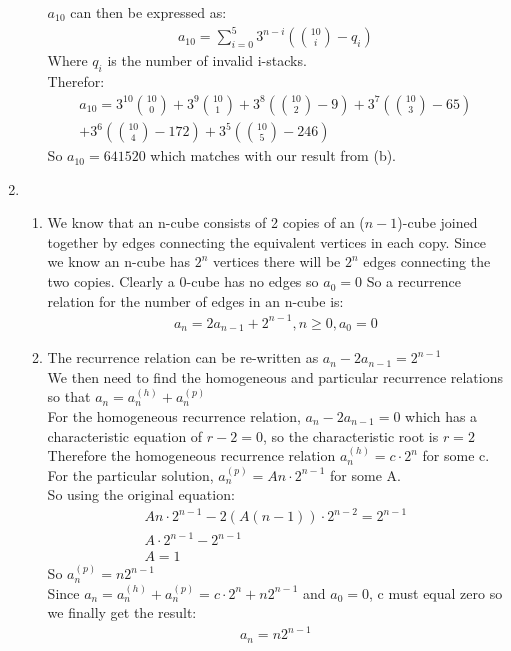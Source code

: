 \documentclass[11pt]{article}
\begin{document}
\begin{enumerate}[]
\begin{enumerate}
	$a_{10}$ can then be expressed as:
	\begin{gather}
		a_{10} = \sum_{i=0}^5 3^{n-i}(\binom{10}{i}-q_i) \nonumber
	\end{gather}
	Where $q_i$ is the number of invalid i-stacks.\\
	Therefor:
	\begin{gather}
		a_{10} = 3^{10}\binom{10}{0} + 3^{9}\binom{10}{1} + 3^{8}(\binom{10}{2} - 9) + 3^{7}(\binom{10}{3} - 65)\nonumber\\ + 3^{6}(\binom{10}{4} - 172) + 3^{5}(\binom{10}{5} - 246) \nonumber
	\end{gather}
	So $a_{10} = 641520$ which matches with our result from (b).
	\end{enumerate}
\item
	\begin{enumerate}
	\item We know that an n-cube consists of 2 copies of an ($n-1$)-cube joined together by edges connecting the equivalent vertices in each copy. Since we know an n-cube has $2^n$ vertices there will be $2^n$ edges connecting the two copies. Clearly a 0-cube has no edges so $a_0=0$  So a recurrence relation for the number of edges in an n-cube is:
	\begin{gather}
		a_n=2a_{n-1} + 2^{n-1}, n\geq 0, a_0=0 \nonumber
	\end{gather}
	\item The recurrence relation can be re-written as $a_n-2a_{n-1}=2^{n-1}$\\
	We then need to find the homogeneous and particular recurrence relations so that $a_n=a_n^{(h)} + a_n^{(p)}$\\
	For the homogeneous recurrence relation, $a_n-2a_{n-1}=0$ which has a characteristic equation of $r-2=0$, so the characteristic root is $r=2$\\
	Therefore the homogeneous recurrence relation $a_n^{(h)}=c\cdot 2^n$ for some c.\\
	For the particular solution, $a_n^{(p)} = An\cdot 2^{n-1}$ for some A.\\
	So using the original equation:
	\begin{gather}
		An\cdot 2^{n-1} - 2(A(n-1))\cdot 2^{n-2} = 2^{n-1} \nonumber\\
		A\cdot 2^{n-1} - 2^{n-1} \nonumber\\
		A = 1 \nonumber
	\end{gather}
	So $a_n^{(p)} = n2^{n-1}$\\
	Since $a_n=a_n^{(h)} + a_n^{(p)}=c\cdot 2^n + n2^{n-1}$ and $a_0=0$, c must equal zero so we finally get the result:
	\begin{gather}
		a_n = n2^{n-1} \nonumber
	\end{gather}
	\end{enumerate}
\end{enumerate}
\end{document}
